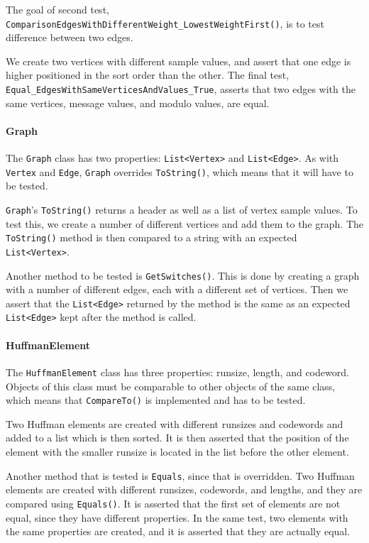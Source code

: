 The goal of second test, \lstinline|ComparisonEdgesWithDifferentWeight_LowestWeightFirst()|, is to test difference between two edges.

We create two vertices with different sample values, and assert that one edge is higher positioned in the sort order than the other.
The final test, \lstinline|Equal_EdgesWithSameVerticesAndValues_True|, asserts that two edges with the same vertices, message values, and modulo values, are equal.

\paragraph*{Graph}
The \lstinline|Graph| class has two properties: \lstinline|List<Vertex>| and \lstinline|List<Edge>|.
As with \lstinline|Vertex| and \lstinline|Edge|, \lstinline|Graph| overrides \lstinline|ToString()|, which means that it will have to be tested.

\lstinline|Graph|'s \lstinline|ToString()| returns a header as well as a list of vertex sample values.
To test this, we create a number of different vertices and add them to the graph.
The \lstinline|ToString()| method is then compared to a string with an expected \lstinline|List<Vertex>|.

Another method to be tested is \lstinline|GetSwitches()|.
This is done by creating a graph with a number of different edges, each with a different set of vertices.
Then we assert that the \lstinline|List<Edge>| returned by the method is the same as an expected \lstinline|List<Edge>| kept after the method is called.

\paragraph*{HuffmanElement}
The \lstinline|HuffmanElement| class has three properties: runsize, length, and codeword.
Objects of this class must be comparable to other objects of the same class, which means that \lstinline|CompareTo()| is implemented and has to be tested.

Two Huffman elements are created with different runsizes and codewords and added to a list which is then sorted.
It is then asserted that the position of the element with the smaller runsize is located in the list before the other element.

Another method that is tested is \lstinline|Equals|, since that is overridden.
Two Huffman elements are created with different runsizes, codewords, and lengths, and they are compared using \lstinline|Equals()|.
It is asserted that the first set of elements are not equal, since they have different properties.
In the same test, two elements with the same properties are created, and it is asserted that they are actually equal.


